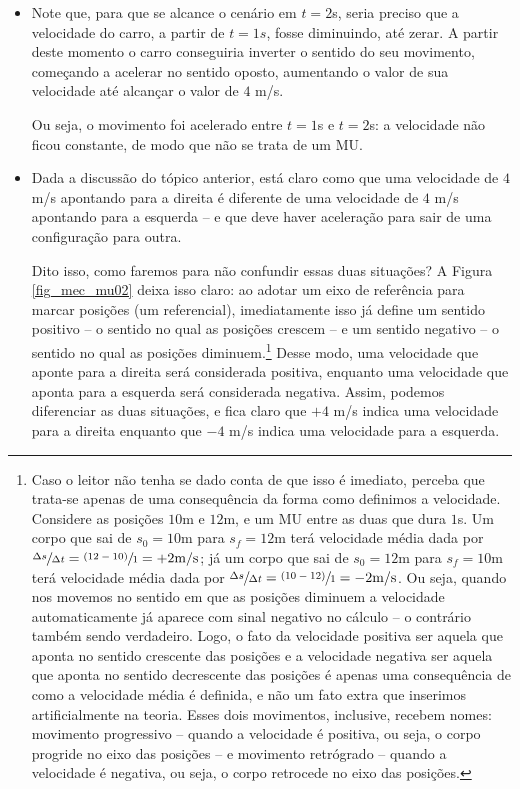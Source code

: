 \begin{itemize}
    \item [(i)] Note que, para que se alcance o cenário em $t=2$s, seria preciso que a velocidade do carro, a partir de $t=1s$, fosse diminuindo, até zerar. A partir deste momento o carro conseguiria inverter o sentido do seu movimento, começando a acelerar no sentido oposto, aumentando o valor de sua velocidade até alcançar o valor de $4$ m/s.

    Ou seja, o movimento foi acelerado entre $t=1$s e $t=2$s: a velocidade não ficou constante, de modo que não se trata de um MU.


    \item [(ii)] Dada a discussão do tópico anterior, está claro como que uma velocidade de $4$ m/s apontando para a direita é diferente de uma velocidade de $4$ m/s apontando para a esquerda -- e que deve haver aceleração para sair de uma configuração para outra.

    Dito isso, como faremos para não confundir essas duas situações? A Figura \ref{fig_mec_mu02} deixa isso claro: ao adotar um eixo de referência para marcar posições (um referencial), imediatamente isso já define um sentido positivo -- o sentido no qual as posições crescem -- e um sentido negativo -- o sentido no qual as posições diminuem.\footnote{Caso o leitor não tenha se dado conta de que isso é imediato, perceba que trata-se apenas de uma consequência da forma como definimos a velocidade. Considere as posições $10$m e $12$m, e um MU entre as duas que dura $1$s. Um corpo que sai de $s_0=10$m para $s_f=12$m terá velocidade média dada por $\sfrac{\Delta s}{\Delta t}=\sfrac{(12-10)}{1}=+2\text{m/s}$; já um corpo que sai de $s_0=12$m para $s_f=10$m terá velocidade média dada por $\sfrac{\Delta s}{\Delta t}=\sfrac{(10-12)}{1}=-2\text{m/s}$. Ou seja, quando nos movemos no sentido em que as posições diminuem a velocidade automaticamente já aparece com sinal negativo no cálculo -- o contrário também sendo verdadeiro. Logo, o fato da velocidade positiva ser aquela que aponta no sentido crescente das posições e a velocidade negativa ser aquela que aponta no sentido decrescente das posições é apenas uma consequência de como a velocidade média é definida, e não um fato extra que inserimos artificialmente na teoria. Esses dois movimentos, inclusive, recebem nomes: movimento progressivo -- quando a velocidade é positiva, ou seja, o corpo progride no eixo das posições -- e movimento retrógrado -- quando a velocidade é negativa, ou seja, o corpo retrocede no eixo das posições. } Desse modo, uma velocidade que aponte para a direita será considerada positiva, enquanto uma velocidade que aponta para a esquerda será considerada negativa. Assim, podemos diferenciar as duas situações, e fica claro que $+4$ m/s indica uma velocidade para a direita enquanto que $-4$ m/s indica uma velocidade para a esquerda.


\end{itemize}
